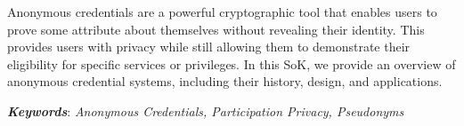 Anonymous credentials are a powerful cryptographic tool that enables users to prove some attribute about themselves without revealing their identity. This provides users with privacy while still allowing them to demonstrate their eligibility for specific services or privileges. In this SoK, we provide an overview of anonymous credential systems, including their history, design, and applications.

\vspace{0.51cm}

\textbf{\textit{Keywords}}: \textit{Anonymous Credentials, Participation Privacy, Pseudonyms}